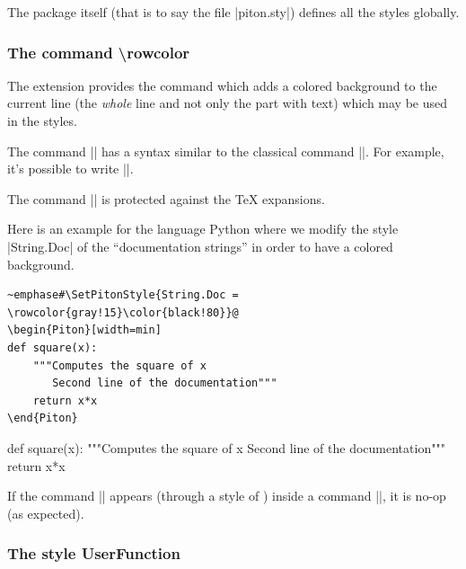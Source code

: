 \documentclass{article}
\begin{document}
\bigskip
The package  itself (that is to say the file |piton.sty|) defines
all the styles globally. 

\bigskip

\bigskip
\subsubsection{The command \textbackslash rowcolor}

\label{rowcolor}

\medskip
The extension  provides the command  which adds
a colored background to the current line (the \emph{whole} line and not only the part with
text) which may be used in the styles.

\smallskip
The command |\rowcolor| has a syntax similar to the classical command |\color|. For example,
it's possible to write ||.

\smallskip
The command |\rowcolor| is protected against the TeX expansions.

\smallskip
Here is an example for the language Python where we modify the style |String.Doc|
of the ``documentation strings'' in order to have a colored background.

\begin{Verbatim}
~emphase#\SetPitonStyle{String.Doc = \rowcolor{gray!15}\color{black!80}}@
\begin{Piton}[width=min]
def square(x):
    """Computes the square of x
       Second line of the documentation"""
    return x*x
\end{Piton}
\end{Verbatim}


\bigskip
\begingroup
{}
\begin{Piton}[width=min]
def square(x):
    """Computes the square of x
       Second line of the documentation"""
    return x*x
\end{Piton}
\endgroup


\bigskip
If the command |\rowcolor| appears (through a style of ) inside a
command |\piton|, it is no-op (as expected).


\subsubsection{The style UserFunction}

\end{document}
